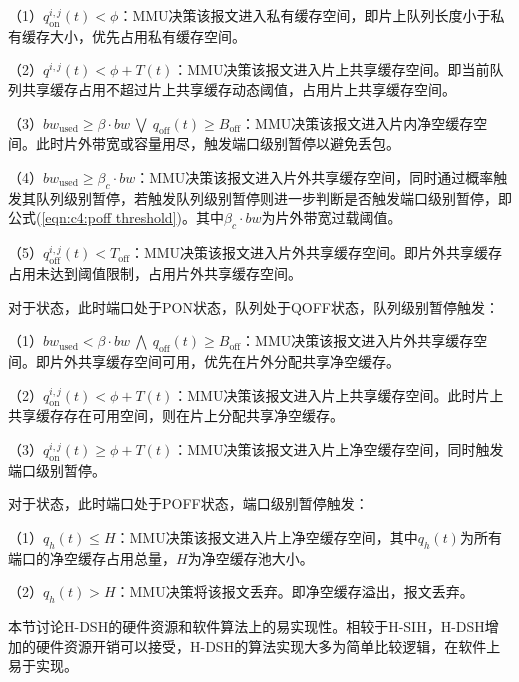 \setcounter{paragraph}{0}

（1）$q^{i,j}_{\text{on}}(t)<\phi$：MMU决策该报文进入私有缓存空间，即片上队列长度小于私有缓存大小，优先占用私有缓存空间。

（2）$q^{i,j}(t)< \phi+T(t)$：MMU决策该报文进入片上共享缓存空间。即当前队列共享缓存占用不超过片上共享缓存动态阈值，占用片上共享缓存空间。

（3）$bw_{\text{used}} \geqslant \beta \cdot bw ~\bigvee ~q_{\text{off}}(t) \geqslant B_{\text{off}}$：MMU决策该报文进入片内净空缓存空间。此时片外带宽或容量用尽，触发端口级别暂停以避免丢包。

（4）$bw_{\text{used}} \geqslant \beta_{c} \cdot bw$：MMU决策该报文进入片外共享缓存空间，同时通过概率触发其队列级别暂停，若触发队列级别暂停则进一步判断是否触发端口级别暂停，即公式(\ref{eqn:c4:poff threshold})。其中$\beta_c \cdot bw$为片外带宽过载阈值。

（5）$q^{i,j}_{\text{off}}(t) < T_{\text{off}}$：MMU决策该报文进入片外共享缓存空间。即片外共享缓存占用未达到阈值限制，占用片外共享缓存空间。

对于状态，此时端口处于PON状态，队列处于QOFF状态，队列级别暂停触发：

\setcounter{paragraph}{0}

（1）$bw_{\text{used}} < \beta \cdot bw ~\bigwedge ~q_{\text{off}}(t) \geqslant B_{\text{off}}$：MMU决策该报文进入片外共享缓存空间。即片外共享缓存空间可用，优先在片外分配共享净空缓存。

（2）$q_{\text{on}}^{i,j}(t)< \phi+T(t)$：MMU决策该报文进入片上共享缓存空间。此时片上共享缓存存在可用空间，则在片上分配共享净空缓存。

（3）$q_{\text{on}}^{i,j}(t) \geqslant \phi+T(t)$：MMU决策该报文进入片上净空缓存空间，同时触发端口级别暂停。

对于状态，此时端口处于POFF状态，端口级别暂停触发：

\setcounter{paragraph}{0}

（1）$q_{h}(t) \leqslant H$：MMU决策该报文进入片上净空缓存空间，其中$q_{h}(t)$为所有端口的净空缓存占用总量，$H$为净空缓存池大小。

（2）$q_{h}(t) > H$：MMU决策将该报文丢弃。即净空缓存溢出，报文丢弃。


\label{c4:s4:hdsh implementation}

本节讨论H-DSH的硬件资源和软件算法上的易实现性。相较于H-SIH，H-DSH增加的硬件资源开销可以接受，H-DSH的算法实现大多为简单比较逻辑，在软件上易于实现。


